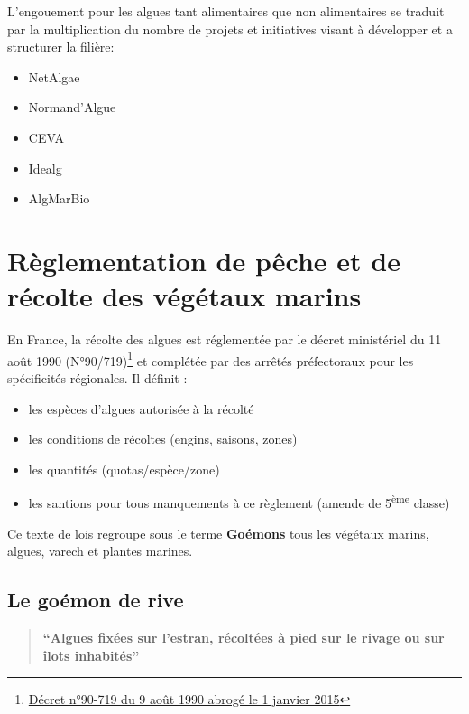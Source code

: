\documentclass[
]{book}
\providecommand{\tightlist}{%
  \setlength{\itemsep}{0pt}\setlength{\parskip}{0pt}}
\begin{document}
L'engouement pour les algues tant alimentaires que non alimentaires se traduit par la multiplication du nombre de projets et initiatives visant à développer et a structurer la filière:

\begin{itemize}
\tightlist
\item
  NetAlgae
\item
  Normand'Algue
\item
  CEVA
\item
  Idealg
\item
  AlgMarBio
\end{itemize}

\hypertarget{ruxe8glementation-de-puxeache-et-de-ruxe9colte-des-vuxe9guxe9taux-marins}{%
\section{Règlementation de pêche et de récolte des végétaux marins}\label{ruxe8glementation-de-puxeache-et-de-ruxe9colte-des-vuxe9guxe9taux-marins}}

En France, la récolte des algues est réglementée par le décret ministériel du 11 août 1990 (N°90/719)\footnote{\href{https://www.lejpgrance.gouv.fr/affichTexte.do?cidTexte=LEGITEXT000006076323}{Décret n°90-719 du 9 août 1990 abrogé le 1 janvier 2015}} et complétée par des arrêtés préfectoraux pour les spécificités régionales. Il définit :

\begin{itemize}
\tightlist
\item
  les espèces d'algues autorisée à la récolté
\item
  les conditions de récoltes (engins, saisons, zones)
\item
  les quantités (quotas/espèce/zone)
\item
  les santions pour tous manquements à ce règlement (amende de 5\textsuperscript{ème} classe)
\end{itemize}

Ce texte de lois regroupe sous le terme \textbf{Goémons} tous les végétaux marins, algues, varech et plantes marines.

\hypertarget{le-gouxe9mon-de-rive}{%
\subsection{Le goémon de rive}\label{le-gouxe9mon-de-rive}}

\begin{quote}
\textbf{``Algues fixées sur l'estran, récoltées à pied sur le rivage ou sur îlots inhabités''}
\end{quote}
\end{document}
